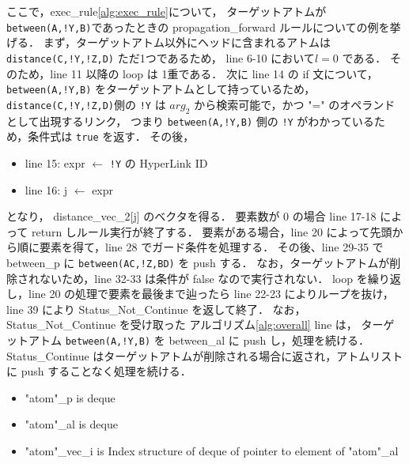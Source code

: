 ここで，exec\_rule\ref{alg:exec_rule}について，
ターゲットアトムが \texttt{between(A,!Y,B)}であったときの propagation\_forward ルールについての例を挙げる．
まず，ターゲットアトム以外にヘッドに含まれるアトムは \texttt{distance(C,!Y,!Z,D)} ただ1つであるため， line 6-10 において$l=0$ である．
そのため，line 11 以降の loop は 1重である．
次に line 14 の if 文について，\texttt{between(A,!Y,B)} をターゲットアトムとして持っているため，
\texttt{distance(C,!Y,!Z,D)}側の \texttt{!Y} は $arg_2$ から検索可能で，かつ "=" のオペランドとして出現するリンク，
つまり \texttt{between(A,!Y,B)} 側の \texttt{!Y} がわかっているため，条件式は \texttt{true} を返す．
その後，
\begin{itemize}
    \item line 15: expr $\gets$ \texttt{!Y} の HyperLink ID
    \item line 16: j $\gets$ expr
\end{itemize}
となり，
distance\_vec\_2[j] のベクタを得る．
要素数が 0 の場合 line 17-18 によって return しルール実行が終了する．
要素がある場合，line 20 によって先頭から順に要素を得て，line 28 でガード条件を処理する．
その後、line 29-35 で between\_p に \texttt{between(AC,!Z,BD)} を push する．
なお，ターゲットアトムが削除されないため，line 32-33 は条件が false なので実行されない．
loop を繰り返し，line 20 の処理で要素を最後まで辿ったら line 22-23 によりループを抜け，
line 39 により Status\_Not\_Continue を返して終了．
なお， Status\_Not\_Continue を受け取った アルゴリズム\ref{alg:overall} line は，
ターゲットアトム \texttt{between(A,!Y,B)} を between\_al に push し，処理を続ける．
Status\_Continue はターゲットアトムが削除される場合に返され，アトムリストに push することなく処理を続ける．


\begin{itemize}
    \item "atom"\_p is deque
    \item "atom"\_al is deque
    \item "atom"\_vec\_i is Index structure of deque of pointer to element of "atom"\_al
\end{itemize}


